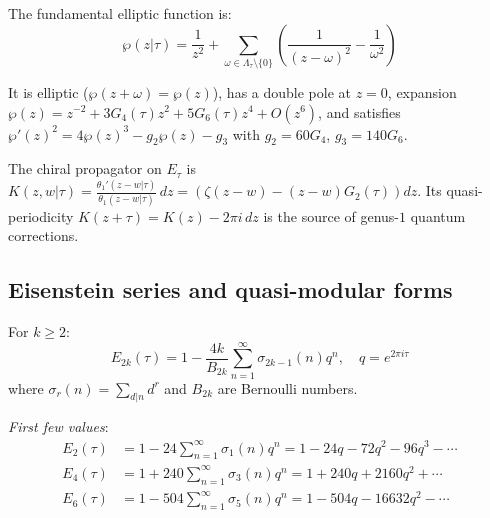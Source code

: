 \begin{definition}
\label{def:weierstrass-p}
The fundamental elliptic function is:
\begin{equation}
\wp(z|\tau) = \frac{1}{z^2} + \sum_{\omega \in \Lambda_\tau \setminus \{0\}} 
\left(\frac{1}{(z-\omega)^2} - \frac{1}{\omega^2}\right)
\end{equation}

It is elliptic ($\wp(z + \omega) = \wp(z)$), has a double pole at $z = 0$, expansion $\wp(z) = z^{-2} + 3G_4(\tau) z^2 + 5G_6(\tau) z^4 + O(z^6)$, and satisfies $\wp'(z)^2 = 4\wp(z)^3 - g_2\wp(z) - g_3$ with $g_2 = 60G_4$, $g_3 = 140G_6$.
\end{definition}

\begin{remark}
\label{rem:wp-config-space}
The chiral propagator on $E_\tau$ is
$K(z,w|\tau) = \frac{\theta_1'(z-w|\tau)}{\theta_1(z-w|\tau)} \, dz = \left(\zeta(z-w) - (z-w)G_2(\tau)\right) dz$.
Its quasi-periodicity $K(z+\tau) = K(z) - 2\pi i\, dz$ is the source of genus-$1$ quantum corrections.
\end{remark}

\subsection{Eisenstein series and quasi-modular forms}

\begin{definition}
\label{def:eisenstein}
For $k \geq 2$:
\begin{equation}
E_{2k}(\tau) = 1 - \frac{4k}{B_{2k}} \sum_{n=1}^{\infty} \sigma_{2k-1}(n) q^n, \quad q = e^{2\pi i \tau}
\end{equation}
where $\sigma_r(n) = \sum_{d|n} d^r$ and $B_{2k}$ are Bernoulli numbers.

\emph{First few values}:
\begin{align}
E_2(\tau) &= 1 - 24\sum_{n=1}^{\infty} \sigma_1(n) q^n = 1 - 24q - 72q^2 - 96q^3 - \cdots \\
E_4(\tau) &= 1 + 240\sum_{n=1}^{\infty} \sigma_3(n) q^n = 1 + 240q + 2160q^2 + \cdots \\
E_6(\tau) &= 1 - 504\sum_{n=1}^{\infty} \sigma_5(n) q^n = 1 - 504q - 16632q^2 - \cdots
\end{align}
\end{definition}

